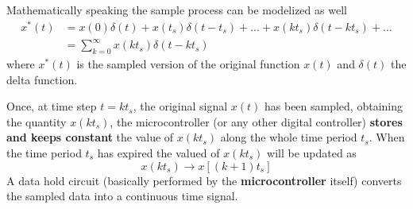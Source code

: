 \documentclass[11pt,a4paper,oneside]{book}
\numberwithin{equation}{section}
\theoremstyle{it}
\theoremstyle{definition}
\begin{document}
Mathematically speaking the sample process can be modelized as well
\begin{equation}\label{}
	\begin{split}
		x^*(t) &= x(0)\delta(t)+x(t_s)\delta(t-t_s)+... 
		+x(kt_s)\delta(t-kt_s)+...\\[6pt]
		&= \sum_{k=0}^{\infty}x(kt_s)\delta(t-kt_s)
	\end{split}
\end{equation}
where $x^*(t)$ is the sampled version of the original function $x(t)$ and 
$\delta(t)$ the delta function.

Once, at time step $t=kt_s$, the original signal $x(t)$ has been sampled, 
obtaining the quantity $x(kt_s)$, the microcontroller 
(or any other digital controller) \textbf{stores and keeps constant} the value 
of $x(kt_s)$ along the whole time period $t_s$. When the time period $t_s$ has 
expired the valued of $x(kt_s)$ will be updated as
\begin{equation}
	x(kt_s)\rightarrow x[(k+1)t_s]
\end{equation}
A data hold circuit (basically performed by the \textbf{microcontroller} 
itself) converts the sampled data into a continuous time signal.
\end{document}
